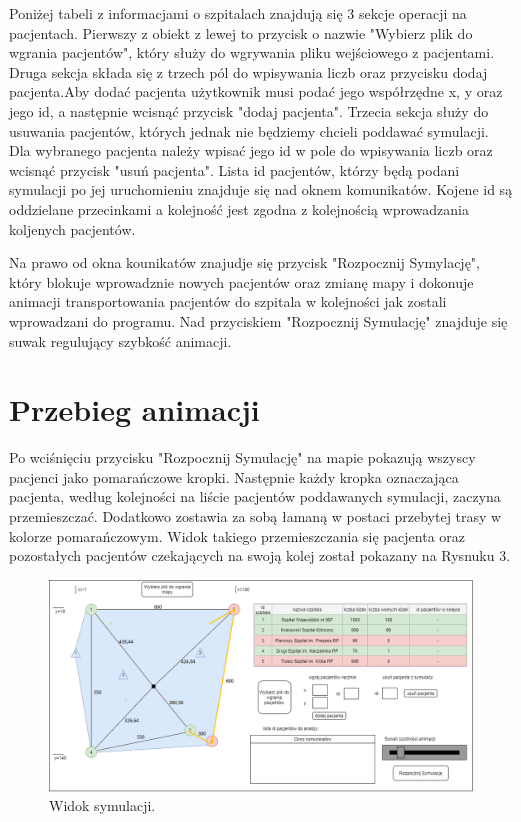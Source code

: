 \documentclass[10pt,a4paper]{article}
\begin{document}
Poniżej tabeli z informacjami o szpitalach znajdują się 3 sekcje operacji na pacjentach. Pierwszy z obiekt z lewej to przycisk o nazwie "Wybierz plik do wgrania pacjentów", który służy do wgrywania pliku wejściowego z pacjentami. Druga sekcja składa się z trzech pól do wpisywania liczb oraz przycisku dodaj pacjenta.Aby dodać pacjenta użytkownik musi podać jego współrzędne x, y oraz jego id, a następnie wcisnąć przycisk "dodaj pacjenta". Trzecia sekcja służy do usuwania pacjentów, których jednak nie będziemy chcieli poddawać symulacji. Dla wybranego pacjenta należy wpisać jego id w pole do wpisywania liczb oraz wcisnąć przycisk "usuń pacjenta". Lista id pacjentów, którzy będą podani symulacji po jej uruchomieniu znajduje się nad oknem komunikatów. Kojene id są oddzielane przecinkami a kolejność jest zgodna z kolejnością wprowadzania koljenych pacjentów.

Na prawo od okna kounikatów znajudje się przycisk "Rozpocznij Symylację", który blokuje wprowadznie nowych pacjentów oraz zmianę mapy i dokonuje animacji transportowania pacjentów do szpitala w kolejności jak zostali wprowadzani do programu. Nad przyciskiem "Rozpocznij Symulację" znajduje się suwak regulujący szybkość animacji.

\section{Przebieg animacji}

Po wciśnięciu przycisku "Rozpocznij Symulację" na mapie pokazują wszyscy pacjenci jako pomarańczowe kropki. Następnie każdy kropka oznaczająca pacjenta, według kolejności na liście pacjentów poddawanych symulacji, zaczyna przemieszczać. Dodatkowo zostawia za sobą łamaną w postaci przebytej trasy w kolorze pomarańczowym. Widok takiego przemieszczania się pacjenta oraz pozostałych pacjentów czekających na swoją kolej został pokazany na Rysnuku 3.

\begin{figure}[h]
  \includegraphics[width=\linewidth]{./images/widok_symulacji.png}
  \caption{Widok symulacji.}
  \label{fig:GUIsym}
\end{figure}
\end{document}
